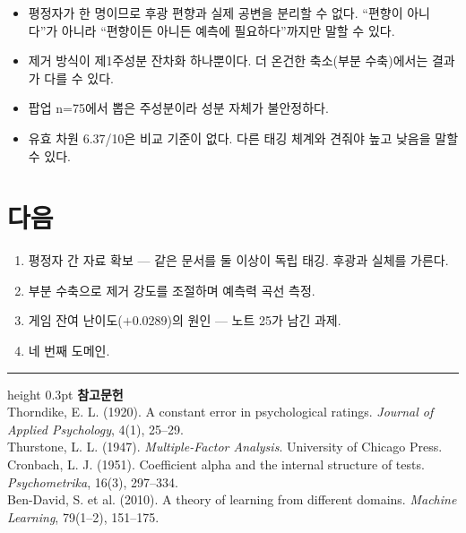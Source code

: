 \documentclass[10pt]{article}
\begin{document}
\begin{itemize}[leftmargin=1.1em,itemsep=0.15em]
\item 평정자가 한 명이므로 후광 편향과 실제 공변을 분리할 수 없다. ``편향이
      아니다''가 아니라 ``편향이든 아니든 예측에 필요하다''까지만 말할 수 있다.
\item 제거 방식이 제1주성분 잔차화 하나뿐이다. 더 온건한 축소(부분 수축)에서는
      결과가 다를 수 있다.
\item 팝업 n=75에서 뽑은 주성분이라 성분 자체가 불안정하다.
\item 유효 차원 6.37/10은 비교 기준이 없다. 다른 태깅 체계와 견줘야 높고 낮음을
      말할 수 있다.
\end{itemize}

\section{다음}

\begin{enumerate}[leftmargin=1.3em,itemsep=0.15em]
\item 평정자 간 자료 확보 --- 같은 문서를 둘 이상이 독립 태깅. 후광과 실체를 가른다.
\item 부분 수축으로 제거 강도를 조절하며 예측력 곡선 측정.
\item 게임 잔여 난이도($+$0.0289)의 원인 --- 노트 25가 남긴 과제.
\item 네 번째 도메인.
\end{enumerate}

\vspace{0.6em}
\hrule height 0.3pt
\vspace{0.5em}
{\footnotesize
\textbf{참고문헌}\\[0.3em]
Thorndike, E. L. (1920). A constant error in psychological ratings.
\emph{Journal of Applied Psychology}, 4(1), 25--29.\\[0.15em]
Thurstone, L. L. (1947). \emph{Multiple-Factor Analysis}. University of Chicago Press.\\[0.15em]
Cronbach, L. J. (1951). Coefficient alpha and the internal structure of tests.
\emph{Psychometrika}, 16(3), 297--334.\\[0.15em]
Ben-David, S. et al. (2010). A theory of learning from different domains.
\emph{Machine Learning}, 79(1--2), 151--175.
}
\end{document}
